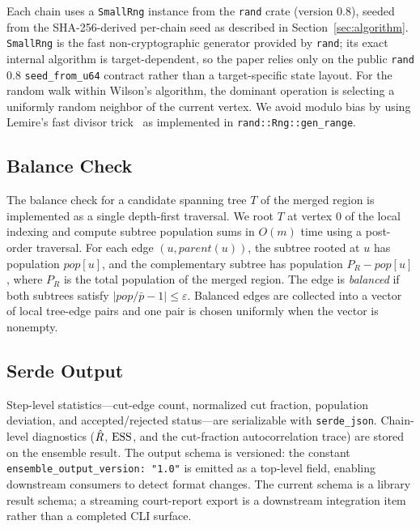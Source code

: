 Each chain uses a \texttt{SmallRng} instance from the \texttt{rand} crate
(version 0.8), seeded from the SHA-256-derived per-chain seed as described
in Section~\ref{sec:algorithm}.
\texttt{SmallRng} is the fast non-cryptographic generator provided by
\texttt{rand}; its exact internal algorithm is target-dependent, so the paper
relies only on the public \texttt{rand} 0.8 \texttt{seed\_from\_u64} contract
rather than a target-specific state layout.
For the random walk within Wilson's algorithm, the dominant operation is
selecting a uniformly random neighbor of the current vertex.
We avoid modulo bias by using Lemire's fast divisor trick~\citep{lemire2019fast}
as implemented in \texttt{rand::Rng::gen\_range}.

\subsection{Balance Check}

The balance check for a candidate spanning tree $T$ of the merged region
is implemented as a single depth-first traversal.
We root $T$ at vertex 0 of the local indexing and compute subtree
population sums in $O(m)$ time using a post-order traversal.
For each edge $(u, \mathit{parent}(u))$, the subtree rooted at $u$ has
population $\mathit{pop}[u]$, and the complementary subtree has
population $P_R - \mathit{pop}[u]$, where $P_R$ is the total population
of the merged region.
The edge is \emph{balanced} if both subtrees satisfy
$|\mathit{pop}/\bar{p} - 1| \leq \varepsilon$.
Balanced edges are collected into a vector of local tree-edge pairs and one
pair is chosen uniformly when the vector is nonempty.

\subsection{Serde Output}

Step-level statistics---cut-edge count, normalized cut fraction, population
deviation, and accepted/rejected status---are serializable with
\texttt{serde\_json}. Chain-level diagnostics ($\hat{R}$, $\mathrm{ESS}$, and the
cut-fraction autocorrelation trace) are stored on the ensemble result.
The output schema is versioned: the constant
\texttt{ensemble\_output\_version: "1.0"} is emitted as a top-level field,
enabling downstream consumers to detect format changes.
The current schema is a library result schema; a streaming court-report export
is a downstream integration item rather than a completed CLI surface.

